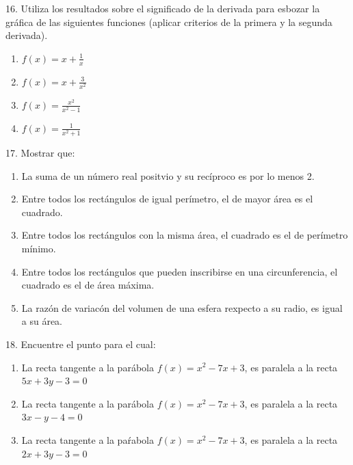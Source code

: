 \documentclass[12pt]{article}
\begin{document}
16. Utiliza los resultados sobre el significado de la derivada para esbozar la gr\'afica de las siguientes funciones (aplicar criterios de la primera y la segunda derivada).

\begin{enumerate}[\hspace{9px} a)]
    \item \(f(x)=x+\displaystyle\frac{1}{x}\)
    \item \(f(x)=x+\displaystyle\frac{3}{x^2}\)
    \item \(f(x)=\displaystyle\frac{x^2}{x^2-1}\)
    \item \(f(x)=\displaystyle\frac{1}{x^2+1}\)
\end{enumerate}

17. Mostrar que:

\begin{enumerate}[\hspace{9px} a)]
    \item La suma de un n\'umero real positvio y su rec\'iproco es por lo menos 2.
    \item Entre todos los rect\'angulos de igual per\'imetro, el de mayor \'area es el cuadrado.
    \item Entre todos los rect\'angulos con la misma \'area, el cuadrado es el de per\'imetro m\'inimo.
    \item Entre todos los rect\'angulos que pueden inscribirse en una circunferencia, el cuadrado es el de \'area m\'axima.
    \item La raz\'on de variac\'on del volumen de una esfera rexpecto a su radio, es igual a su \'area.
\end{enumerate}

18. Encuentre el punto para el cual:

\begin{enumerate}[\hspace{9px} a)]
    \item La recta tangente a la par\'abola \(f(x)=x^2-7x+3\), es paralela a la recta \(5x+3y-3=0\)
    \item La recta tangente a la par\'abola \(f(x)=x^2-7x+3\), es paralela a la recta \(3x-y-4=0\)
    \item La recta tangente a la pa\'rabola \(f(x)=x^2-7x+3\), es paralela a la recta \(2x+3y-3=0\)
\end{enumerate}
\end{document}
